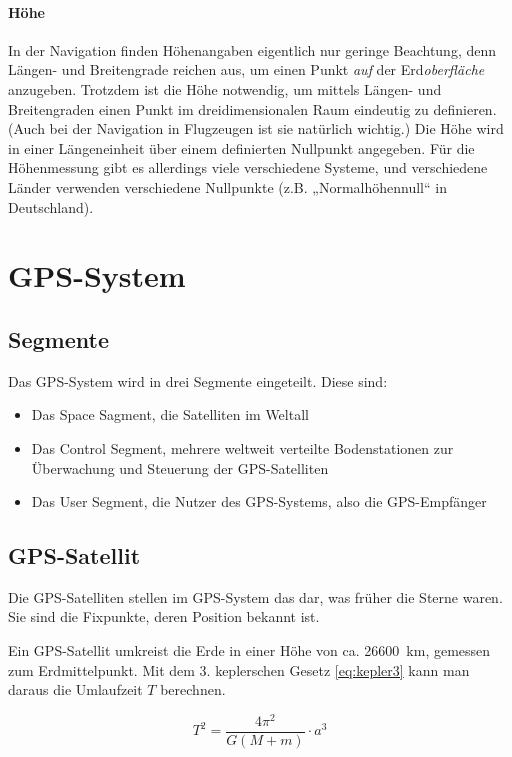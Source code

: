 \documentclass[12pt,a4paper]{scrartcl}
\begin{document}
\paragraph{Höhe}
In der Navigation finden Höhenangaben eigentlich nur geringe Beachtung, denn Längen- und Breitengrade reichen aus, um einen Punkt \emph{auf} der Erd\emph{oberfläche} anzugeben. Trotzdem ist die Höhe notwendig, um mittels Längen- und Breitengraden einen Punkt im dreidimensionalen Raum eindeutig zu definieren. (Auch bei der Navigation in Flugzeugen ist sie natürlich wichtig.) Die Höhe wird in einer Längeneinheit über einem definierten Nullpunkt angegeben. Für die Höhenmessung gibt es allerdings viele verschiedene Systeme, und verschiedene Länder verwenden verschiedene Nullpunkte (z.B. „Normalhöhennull“ in Deutschland).

\section{GPS-System}

\subsection{Segmente}
Das GPS-System wird in drei Segmente eingeteilt. Diese sind:
\begin{itemize}
\item Das Space Sagment, die Satelliten im Weltall
\item Das Control Segment, mehrere weltweit verteilte Bodenstationen zur Überwachung und Steuerung der GPS-Satelliten
\item Das User Segment, die Nutzer des GPS-Systems, also die GPS-Empfänger
\end{itemize}
\cite{gpsgov_segments}

\subsection{GPS-Satellit}
Die GPS-Satelliten stellen im GPS-System das dar, was früher die Sterne waren. Sie sind die Fixpunkte, deren Position bekannt ist.

Ein GPS-Satellit umkreist die Erde in einer Höhe von ca. \SI{26600}{\kilo\meter}, gemessen zum Erdmittelpunkt.
Mit dem 3. keplerschen Gesetz \eqref{eq:kepler3} kann man daraus die Umlaufzeit $T$ berechnen.

\begin{equation}
\label{eq:kepler3}
T^2 = \frac{4 \pi^2}{G (M + m)} \cdot a^3
\end{equation}
\cite{wiki_kepler}
\end{document}
